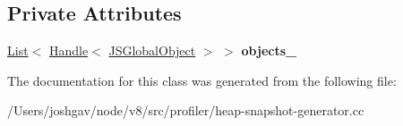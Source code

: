 \subsection*{Private Attributes}
\begin{DoxyCompactItemize}
\item 
\hyperlink{classv8_1_1internal_1_1_list}{List}$<$ \hyperlink{classv8_1_1internal_1_1_handle}{Handle}$<$ \hyperlink{classv8_1_1internal_1_1_j_s_global_object}{J\+S\+Global\+Object} $>$ $>$ {\bfseries objects\+\_\+}\hypertarget{classv8_1_1internal_1_1_global_objects_enumerator_a87d972cbfb646807a5e9f6096f0f43a6}{}\label{classv8_1_1internal_1_1_global_objects_enumerator_a87d972cbfb646807a5e9f6096f0f43a6}

\end{DoxyCompactItemize}


The documentation for this class was generated from the following file\+:\begin{DoxyCompactItemize}
\item 
/\+Users/joshgav/node/v8/src/profiler/heap-\/snapshot-\/generator.\+cc\end{DoxyCompactItemize}
